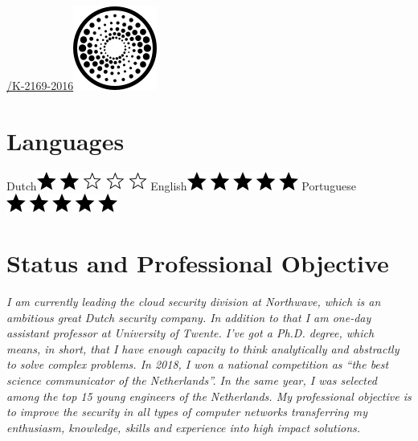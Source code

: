 \documentclass[print]{styles/friggeri-cv-mac} %
\begin{document}
\begin{aside}
\href{http://www.researcherid.com/rid/K-2169-2016}{/K-2169-2016}\includegraphics[scale=0.3]{img/researchid.png}
~
\section{Languages}
Dutch\includegraphics[scale=0.40]{img/2stars.png}
English\includegraphics[scale=0.40]{img/5stars.png}
Portuguese\includegraphics[scale=0.40]{img/5stars.png}
\end{aside}

\section{Status and Professional Objective}\vspace{-10pt}
\noindent\setlength\parindent{12pt}\textit{
	I am currently leading the cloud security division at Northwave, which is an ambitious great Dutch security company.
	In addition to that I am one-day assistant professor at University of Twente. 
	I've got a Ph.D. degree, which means, in short, that I have enough capacity to think analytically and abstractly to solve complex problems. 
	In 2018, I won a national competition as ``the best science communicator of 
	the Netherlands''. In the same year, I was selected among the top 15 young engineers of the Netherlands.
	My professional objective is to improve the security in all types of computer networks transferring my enthusiasm, knowledge, skills and experience into high impact solutions. 
}
\end{document}
